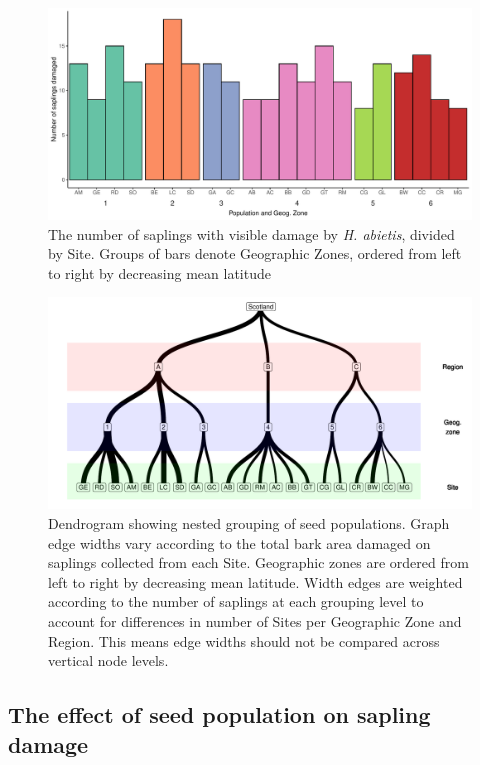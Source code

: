 \documentclass[a4paper, 11pt]{article}
\begin{document}
\begin{figure}[H]
	\includegraphics[width=\textwidth]{barchart}
	\caption{The number of saplings with visible damage by \textit{H. abietis}, divided by Site. Groups of bars denote Geographic Zones, ordered from left to right by decreasing mean latitude}
	\label{barchart}
\end{figure}

\begin{figure}[H]
	\includegraphics[width=\textwidth]{dendro}
	\caption{Dendrogram showing nested grouping of seed populations. Graph edge widths vary according to the total bark area damaged on saplings collected from each Site. Geographic zones are ordered from left to right by decreasing mean latitude. Width edges are weighted according to the number of saplings at each grouping level to account for differences in number of Sites per Geographic Zone and Region. This means edge widths should not be compared across vertical node levels.}
	\label{dendro}
\end{figure}

\subsection*{The effect of seed population on sapling damage}
\end{document}
